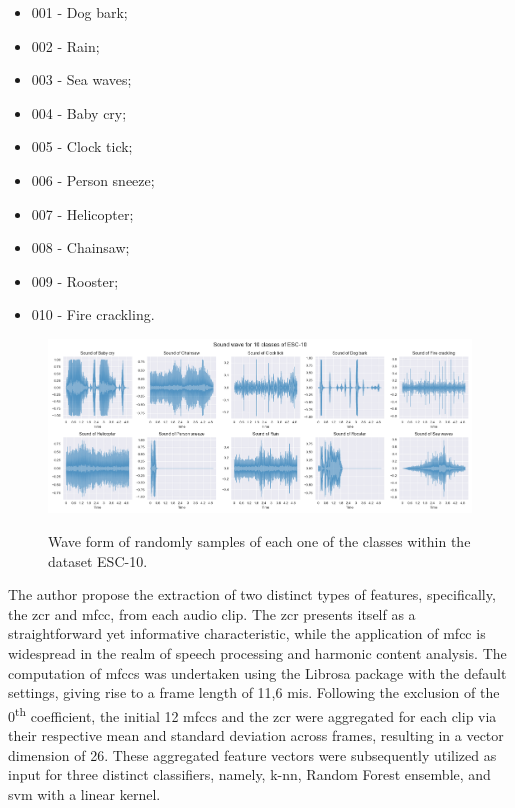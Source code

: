 \begin{itemize}
    \item 001 - Dog bark;
    \item 002 - Rain;
    \item 003 - Sea waves;
    \item 004 - Baby cry;
    \item 005 - Clock tick;
    \item 006 - Person sneeze;
    \item 007 - Helicopter;
    \item 008 - Chainsaw;
    \item 009 - Rooster;
    \item 010 - Fire crackling.
\end{itemize}

\begin{figure}[htbp]
    \raggedright
        \caption{Wave form of randomly samples of each one of the classes within the dataset ESC-10.}
        \includegraphics[width=1\textwidth]{resources/images/050-methods/Methods_dataset_ESC-10.png}
        \label{fig:methods_dataset_ESC-10}
\end{figure}

The author propose the extraction of two distinct types of features, specifically, the \gls{zcr} and \gls{mfcc}, from each audio clip. The \gls{zcr} presents itself as a straightforward yet informative characteristic, while the application of \gls{mfcc} is widespread in the realm of speech processing and harmonic content analysis. The computation of \gls{mfcc}s was undertaken using the Librosa package \cite{McFee2015librosa_sw} with the default settings, giving rise to a frame length of 11,6 \gls{mi}\gls{s}. Following the exclusion of the 0\textsuperscript{th} coefficient, the initial 12 \gls{mfcc}s and the \gls{zcr} were aggregated for each clip via their respective mean and standard deviation across frames, resulting in a vector dimension of 26. These aggregated feature vectors were subsequently utilized as input for three distinct classifiers, namely, \gls{k-nn}, Random Forest ensemble, and \gls{svm} with a linear kernel. 

